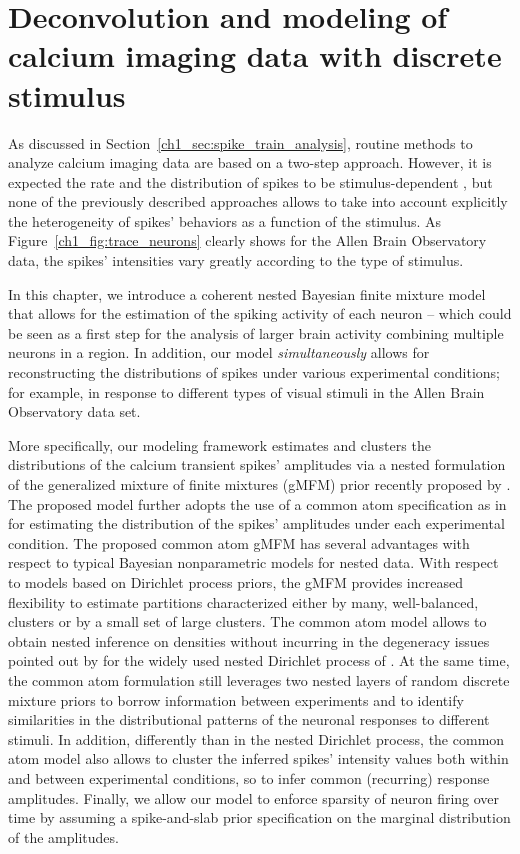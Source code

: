 \chapter{Deconvolution and modeling of calcium imaging data with discrete stimulus}

\vspace{.7cm}
As discussed in Section~\ref{ch1_sec:spike_train_analysis}, routine methods to analyze calcium imaging data are based on a two-step approach. 
However, it is expected the rate and the distribution of spikes to be stimulus-dependent \citep{Brenner2002PhysRevE}, but none of the previously described approaches allows to take into account explicitly the heterogeneity of spikes' behaviors as a function of the stimulus. 
As Figure~\ref{ch1_fig:trace_neurons} clearly shows for the Allen Brain Observatory data, the spikes' intensities vary greatly according to the type of stimulus.

In this chapter, we introduce a coherent nested Bayesian finite mixture model that allows for the estimation of the spiking activity of each neuron -- which could be seen as a first step for the analysis of larger brain activity combining multiple neurons in a region. In addition, our model \textit{simultaneously} allows for reconstructing the distributions of spikes under various experimental conditions; for example, in response to different types of visual stimuli in the Allen Brain Observatory data set. 

More specifically, our modeling framework estimates and clusters the distributions of the calcium transient spikes' amplitudes via a nested formulation of the generalized mixture of finite mixtures (gMFM) prior recently proposed by \citet{fruhwirthschnatter2020}. 
The proposed model further adopts the use of a common atom specification as in \citet{denti2021} for estimating the distribution of the spikes' amplitudes under each experimental condition. The proposed common atom gMFM has several advantages with respect to typical Bayesian nonparametric models for nested data. With respect to models based on Dirichlet process priors, the gMFM provides increased flexibility to estimate partitions characterized either by many, well-balanced, clusters or by a small set of large clusters. The common atom model allows to obtain nested inference on densities without incurring in the degeneracy issues pointed out by \citet{camerlenghi2019} for the widely used nested Dirichlet process of \citet{rodriguez2008}. At the same time, the common atom formulation still leverages two nested layers of random discrete mixture priors to borrow information between experiments and to identify similarities in the distributional patterns of the neuronal responses to different stimuli. In addition, differently than in the nested Dirichlet process, the common atom model also allows to cluster the inferred spikes' intensity values both within and between experimental conditions, so to infer common (recurring) response amplitudes. Finally, we allow our model to enforce sparsity of neuron firing over time by assuming a spike-and-slab prior specification on the marginal distribution of the amplitudes.


